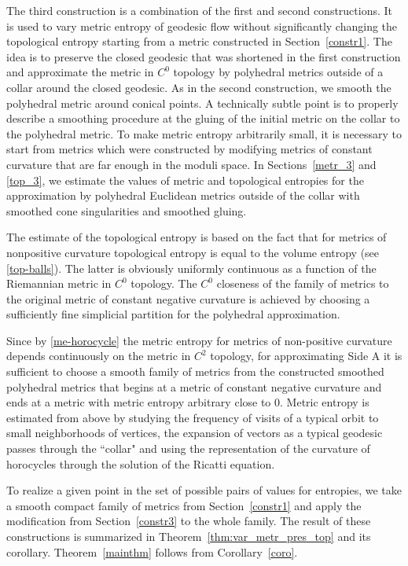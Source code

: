 \documentclass[12pt]{article}
\numberwithin{equation}{section}
\theoremstyle{definition}
\begin{document}
\bigskip

  The third construction is a  combination of the first and second constructions. It is used to vary metric entropy of geodesic flow without significantly changing the topological entropy starting from a metric constructed in Section~\ref{constr1}. The idea is to preserve the closed geodesic that was shortened in the first construction and approximate the metric in $C^0$ topology by polyhedral metrics outside of a collar around  the closed geodesic. As in the second construction, we smooth the polyhedral metric around conical points. A technically subtle point is to  properly describe a smoothing procedure at the gluing of the initial metric on the collar to the polyhedral metric. To make metric entropy arbitrarily small, it is necessary to start from metrics which were constructed by modifying  metrics of constant curvature that are far enough in the moduli space. In Sections~\ref{metr_3} and \ref{top_3}, we estimate the values of metric  and topological entropies for the approximation by polyhedral Euclidean metrics outside of the collar with smoothed cone singularities and smoothed gluing. 

The estimate of the topological entropy is based on the fact that for metrics of nonpositive curvature topological entropy is equal to the volume entropy (see \eqref{top-balls}). The latter is obviously uniformly continuous as a function of the  Riemannian metric in $C^0$ topology. The $C^0$ closeness of the family of metrics to the original metric of constant negative curvature is achieved by choosing a sufficiently fine simplicial partition for the polyhedral approximation. 

Since by \eqref{me-horocycle} the metric entropy for metrics of non-positive curvature depends continuously on the metric in $C^2$ topology, for approximating Side A it is sufficient to choose a smooth family of metrics from the constructed smoothed polyhedral metrics that begins at a metric of constant negative curvature and ends at a metric with metric entropy arbitrary close to $0$. Metric entropy is estimated from above by studying the frequency of visits of a typical orbit to small neighborhoods of vertices, the expansion of vectors as a typical geodesic passes through the ``collar" and using the representation of the curvature of horocycles through the solution of the Ricatti equation.

To realize a given point in the set of possible pairs of values for entropies, we take a smooth compact family of metrics from Section~\ref{constr1} and apply the modification from Section~\ref{constr3} to the whole family. The result of these constructions is summarized in Theorem~\ref{thm:var_metr_pres_top} and its corollary. Theorem~\ref{mainthm} follows from Corollary~\ref{coro}.
\bigskip
\end{document}
